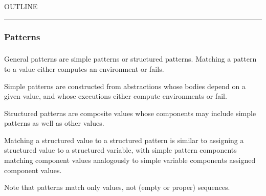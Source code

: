 


    OUTLINE
  \tableofcontents
\begin{center}
\rule{3in}{0.4pt}
\end{center}

\subsubsection{Patterns}\hypertarget{patterns}{}\label{patterns}

\begin{align*}
  [ \
  \KEY{Datatype} \quad & \NAMEREF{patterns} \\
  \KEY{Funcon} \quad & \NAMEREF{pattern} \\
  \KEY{Funcon} \quad & \NAMEREF{pattern-any} \\
  \KEY{Funcon} \quad & \NAMEREF{pattern-bind} \\
  \KEY{Funcon} \quad & \NAMEREF{pattern-type} \\
  \KEY{Funcon} \quad & \NAMEREF{pattern-else} \\
  \KEY{Funcon} \quad & \NAMEREF{pattern-unite} \\
  \KEY{Funcon} \quad & \NAMEREF{match} \\
  \KEY{Funcon} \quad & \NAMEREF{match-loosely} \\
  \KEY{Funcon} \quad & \NAMEREF{case-match} \\
  \KEY{Funcon} \quad & \NAMEREF{case-match-loosely} \\
  \KEY{Funcon} \quad & \NAMEREF{case-variant-value}
  \ ]
\end{align*}
General patterns are simple patterns or structured patterns.
  Matching a pattern to a value either computes an environment or fails.

Simple patterns are constructed from abstractions whose bodies depend on 
  a given value, and whose executions either compute environments or fail.

Structured patterns are composite values whose components may include
  simple patterns as well as other values.

Matching a structured value to a structured pattern is similar to assigning 
  a structured value to a structured variable, with simple pattern components 
  matching component values analogously to simple variable components assigned
  component values.

Note that patterns match only values, not (empty or proper) sequences.

